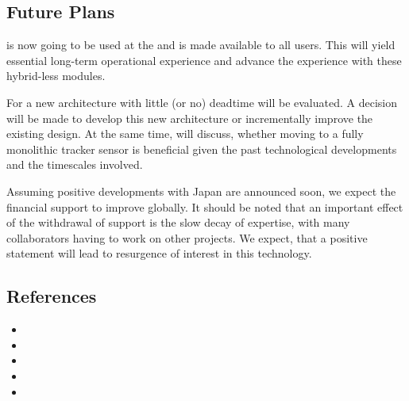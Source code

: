 \subsection{Future Plans}
\LYCORIS is now going to be used at the \DIITBF and is made available to all users. This will yield essential long-term operational experience and 
advance the experience with these hybrid-less modules.  

For \KPIX a new architecture with little (or no) deadtime will be evaluated. A decision will be made to develop this new architecture or incrementally 
improve the existing design. At the same time, \SID will discuss, whether moving to a fully monolithic tracker sensor is beneficial given the past technological 
developments and the timescales involved.
	
Assuming positive developments with Japan are announced soon, we expect the financial support to improve globally. It should be noted that
an important effect of the withdrawal of support is the slow decay of expertise, with many collaborators having to work on other projects. We expect, that 
a positive statement will lead to resurgence of interest in this technology.

	
\subsection{References}

\begin{itemize}
\item {}
\item {}
\item {}
\item {}
\item {}
\end{itemize}
